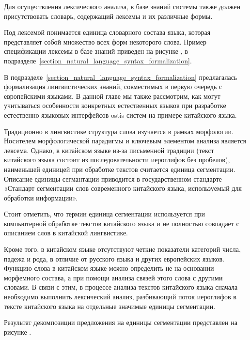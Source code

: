 {Для осуществления лексического анализа, в базе знаний системы также должен присутствовать словарь, содержащий лексемы и их различные формы.

Под лексемой понимается единица словарного состава языка, которая представляет собой множество всех форм некоторого слова.
Пример спецификации лексемы в базе знаний приведен на рисунке \textit{}, в подразделе~\ref{section_natural_language_syntax_formalization}.

В подразделе~\ref{section_natural_language_syntax_formalization} предлагалась формализация лингвистических знаний, совместимых в первую очередь с европейскими языками. В данной главе мы также рассмотрим, как могут учитываться особенности конкретных естественных языков при разработке естественно-языковых интерфейсов ostis-систем на примере китайского языка.

Традиционно в лингвистике структура слова изучается в рамках морфологии.
Носителем морфологической парадигмы и ключевым элементом анализа является лексема.
Однако, в китайском языке из-за письменной традиции (текст китайского языка состоит из последовательности иероглифов без пробелов), наименьшей единицей при обработке текстов считается единица сегментации. Описание единицы сегмантации приводится в государственном стандарте «Стандарт сегментации слов современного китайского языка, используемый для обработки информации».
\begin{SCn}
\end{SCn}

Стоит отметить, что термин единица сегментации используется при компьютерной обработке текстов китайского языка и не полностью совпадает с описанием слов в китайской лингвистике.

Кроме того, в китайском языке отсутствуют четкие показатели категорий числа, падежа и рода, в отличие от русского языка и других европейских языков. Функцию слова в китайском языке можно определить не на основании морфемного состава, а при помощи анализа связей этого слова с другими словами.
В связи с этим, в процессе анализа текстов китайского языка сначала необходимо выполнить лексический анализ, разбивающий поток иероглифов в тексте китайского языка на отдельные значимые единицы сегментации.

Результат декомпозиции предложения на единицы сегментации представлен на рисунке \textit{}.

}
